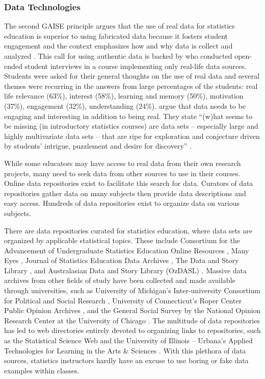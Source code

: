\documentclass[11pt]{isuthesis}
\begin{document}
\subsubsection{Data Technologies} 
\label{DataTech} 

The second GAISE principle argues that the use of real data for statistics education is superior to using fabricated data because it fosters student engagement  and the context emphasizes how and why data is collect and analyzed \citep{GAISEcollege}. This call for using authentic data is backed by \citet{Neumann2013} who conducted open-ended student interviews in a course implementing only real-life data sources. Students were asked for their general thoughts on the use of real data and several themes were recurring in the answers from large percentages of the students: real life relevance (63\%), interest (58\%), learning and memory (50\%), motivation (37\%), engagement (32\%), understanding (24\%). \citet{Finzer2007} argue that data needs to be engaging and interesting in addition to being real.  They state ``(w)hat seems to be missing (in introductory statistics courses) are data sets -- especially large and highly multivariate data sets -- that are ripe for exploration and conjecture driven by students' intrigue, puzzlement and desire for discovery'' \citep[p.1]{Finzer2007}.  

While some educators may have access to real data from their own research projects, many need to seek data from other sources to use in their courses. Online data repositories exist to facilitate this search for data. Curators of data repositories gather data on many subjects then provide data descriptions and easy access. Hundreds of data repositories exist to organize data on various subjects. 

There are data repositories curated for statistics education, where data sets are organized by applicable statistical topics. These include Consortium for the Advancement of Undergraduate Statistics Education Online Resources \citep{CAUSErepo}, Many Eyes \citep{ManyEyes}, Journal of Statistics Education Data Archives \citep{JSErepo}, The Data and Story Library \citep{DASL}, and Australasian Data and Story Library (OzDASL) \citep{OzDASL}. Massive data archives from other fields of study have been collected and made available through universities, such as University of Michigan's Inter-university Consortium for Political and Social Research \citep{ICPSR}, University of Connecticut's Roper Center Public Opinion Archives \citep{Roper}, and the General Social Survey by the National Opinion Research Center at the University of Chicago \citep{GSS}. The multitude of data repositories has led to web directories entirely devoted to organizing links to repositories, such as the Statistical Science Web \citep{SSW} and the University of Illinois -- Urbana's Applied Technologies for Learning in the Arts \& Sciences \citep{ATLAS}.  With this plethora of data sources, statistics instructors hardly have an excuse to use boring or fake data examples within classes. 
\end{document}
